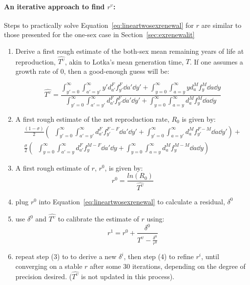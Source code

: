 \paragraph{An iterative approach to find $r^\upsilon$:}
\label{sec:exrenewalit2}
Steps to practically solve Equation~\eqref{eq:lineartwosexrenewal} for $r$ are
similar to those presented for the one-sex case in
Section~\ref{sec:exrenewalit}
\begin{enumerate}
  \item Derive a first rough estimate of the both-sex mean remaining years of
  life at reproduction, $\widehat{T^\upsilon}$, akin to Lotka's mean generation time,
  $T$. If one assumes a growth rate of $0$, then a good-enough guess will be:

\begin{equation}
\widehat{T^\upsilon} = \frac{\int _{y'=0}^\infty \int _{a'=y'}^\infty y'
d_{a'}^F f_{y'}^F \dd a' \dd y' + \int _{y=0}^\infty \int _{a=y}^\infty y
d_{a}^M f_{y}^M \dd a \dd y}{\int _{y'=0}^\infty \int _{a'=y'}^\infty
d_{a'}^F f_{y'}^F \dd a' \dd y' + \int _{y=0}^\infty \int _{a=y}^\infty
d_{a}^M f_{y}^M \dd a \dd y}
\end{equation}

  \item A first rough estimate of the net reproduction rate, $R_0$ is given by:
 \begin{equation}
 \begin{split}
 \frac{(1 - \sigma)}{2} \left(\;\;
            \int _{y'=0}^\infty \int _{a'=y'}^\infty 
                      d_{a'}^F f_{y'}^{F-F} \dd a' \dd y' + 
            \int _{y'=0}^\infty \int _{a=y'}^\infty 
                      d_{a}^M f_{y'}^{F-M} \dd a \dd y'\right) + \\ 
     \frac{\sigma}{2} \left(\;\;
            \int _{y=0}^\infty \int _{a'=y}^\infty 
                      d_{a'}^F f_{y}^{M-F} \dd a' \dd y + 
            \int _{y=0}^\infty \int _{a=y}^\infty 
                      d_{a}^M f_{y}^{M-M} \dd a \dd y \right)
 \end{split}
 \end{equation}
  \item A first rough estimate of $r$, $r^0$, is given by:
   \begin{equation}
   r^0 = \frac{ln(R_0)}{\widehat{T^\upsilon}}
   \end{equation}
  \item plug $r^0$ into Equation~\ref{eq:lineartwosexrenewal} to calculate a
  residual, $\delta^0$
  \item use $\delta^0$ and $\widehat{T^\upsilon}$ to calibrate the estimate of $r$
  using:
  \begin{equation}
  r^{1} = r^0 + \frac{\delta^0}{\widehat{T^\upsilon} - \frac{\delta^0}{r^0}}
  \end{equation}
  \item repeat step (3) to to derive a new $\delta^i$, then step (4) to refine
  $r^i$, until converging on a stable $r$ after some 30 iterations,
  depending on the degree of precision desired. ($\widehat{T^\upsilon}$ is not updated
  in this process).
\end{enumerate}

